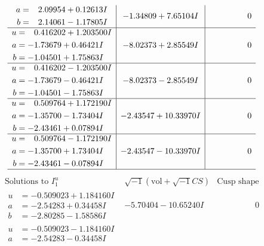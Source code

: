 \documentclass[1p]{elsarticle_modified}
\theoremstyle{definition}
\newcommand{\I}{\sqrt{-1}}
\begin{document}
$$\begin{array}{c|c|c}
\begin{aligned}
a &= \phantom{-}2.09954 + 0.12613 I \\
b &= \phantom{-}2.14061 - 1.17805 I\end{aligned}
 & -1.34809 + 7.65104 I & \phantom{-0.000000 } 0 \\ \hline\begin{aligned}
u &= \phantom{-}0.416202 + 1.203500 I \\
a &= -1.73679 + 0.46421 I \\
b &= -1.04501 + 1.75863 I\end{aligned}
 & -8.02373 + 2.85549 I & \phantom{-0.000000 } 0 \\ \hline\begin{aligned}
u &= \phantom{-}0.416202 - 1.203500 I \\
a &= -1.73679 - 0.46421 I \\
b &= -1.04501 - 1.75863 I\end{aligned}
 & -8.02373 - 2.85549 I & \phantom{-0.000000 } 0 \\ \hline\begin{aligned}
u &= \phantom{-}0.509764 + 1.172190 I \\
a &= -1.35700 - 1.73404 I \\
b &= -2.43461 + 0.07894 I\end{aligned}
 & -2.43547 + 10.33970 I & \phantom{-0.000000 } 0 \\ \hline\begin{aligned}
u &= \phantom{-}0.509764 - 1.172190 I \\
a &= -1.35700 + 1.73404 I \\
b &= -2.43461 - 0.07894 I\end{aligned}
 & -2.43547 - 10.33970 I & \phantom{-0.000000 } 0\\
 \hline 
 \end{array}$$\newpage$$\begin{array}{c|c|c}  
\text{Solutions to }I^u_{1}& \I (\text{vol} + \sqrt{-1}CS) & \text{Cusp shape}\\
 \hline 
\begin{aligned}
u &= -0.509023 + 1.184160 I \\
a &= -2.54283 + 0.34458 I \\
b &= -2.80285 - 1.58586 I\end{aligned}
 & -5.70404 - 10.65240 I & \phantom{-0.000000 } 0 \\ \hline\begin{aligned}
u &= -0.509023 - 1.184160 I \\
a &= -2.54283 - 0.34458 I \\

\end{aligned}
\end{array}$$
\end{document}
